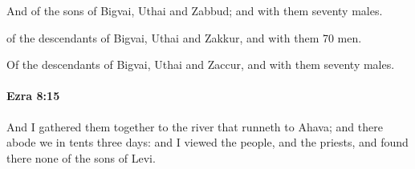 			\begin{versebox}
					\item[BHS] 
					\item[LXX] 
					\item[ASV] And of the sons of Bigvai, Uthai and Zabbud; and with them seventy males.
					\item[NIV] of the descendants of Bigvai, Uthai and Zakkur, and with them 70 men.
					\item[NRSV] Of the descendants of Bigvai, Uthai and Zaccur, and with them seventy males.
			\end{versebox}

		\paragraph{Ezra 8:15} %
			\label{EZRA-8-15}

			And I gathered them together to the river that runneth to Ahava; and there abode we in tents three days: and I viewed the people, and the priests, and found there none of the sons of Levi.

